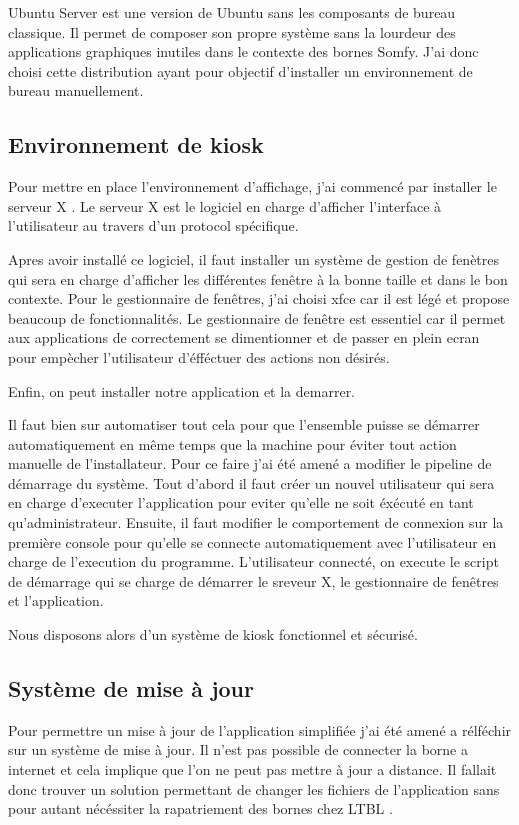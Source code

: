 Ubuntu Server est une version de Ubuntu sans les composants de bureau classique.
Il permet de composer son propre système sans la lourdeur des applications graphiques inutiles dans le contexte des bornes Somfy.
J'ai donc choisi cette distribution ayant pour objectif d'installer un environnement de bureau manuellement.

\subsection{Environnement de kiosk}

Pour mettre en place l'environnement d'affichage, j'ai commencé par installer le serveur X .
Le serveur X est le logiciel en charge d'afficher l'interface à l'utilisateur au travers d'un protocol spécifique.

Apres avoir installé ce logiciel, il faut installer un système de gestion de fenètres qui sera en charge d'afficher les différentes fenêtre à la bonne taille et dans le bon contexte.
Pour le gestionnaire de fenêtres, j'ai choisi xfce car il est légé et propose beaucoup de fonctionnalités.
Le gestionnaire de fenêtre est essentiel car il permet aux applications de correctement se dimentionner et de passer en plein ecran pour empècher l'utilisateur d'éfféctuer des actions non désirés.

Enfin, on peut installer notre application et la demarrer.

Il faut bien sur automatiser tout cela pour que l'ensemble puisse se démarrer automatiquement en même temps que la machine pour éviter tout action manuelle de l'installateur.
Pour ce faire j'ai été amené a modifier le pipeline de démarrage du système.
Tout d'abord il faut créer un nouvel utilisateur qui sera en charge d'executer l'application pour eviter qu'elle ne soit éxécuté en tant qu'administrateur.
Ensuite, il faut modifier le comportement de connexion sur la première console pour qu'elle se connecte automatiquement avec l'utilisateur en charge de l'execution du programme.
L'utilisateur connecté, on execute le script de démarrage qui se charge de démarrer le sreveur X, le gestionnaire de fenêtres et l'application.

Nous disposons alors d'un système de kiosk fonctionnel et sécurisé.

\subsection{Système de mise à jour}

Pour permettre un mise à jour de l'application simplifiée j'ai été amené a rélféchir sur un système de mise à jour.
Il n'est pas possible de connecter la borne a internet et cela implique que l'on ne peut pas mettre à jour a distance.
Il fallait donc trouver un solution permettant de changer les fichiers de l'application sans pour autant nécéssiter la rapatriement des bornes chez LTBL .

